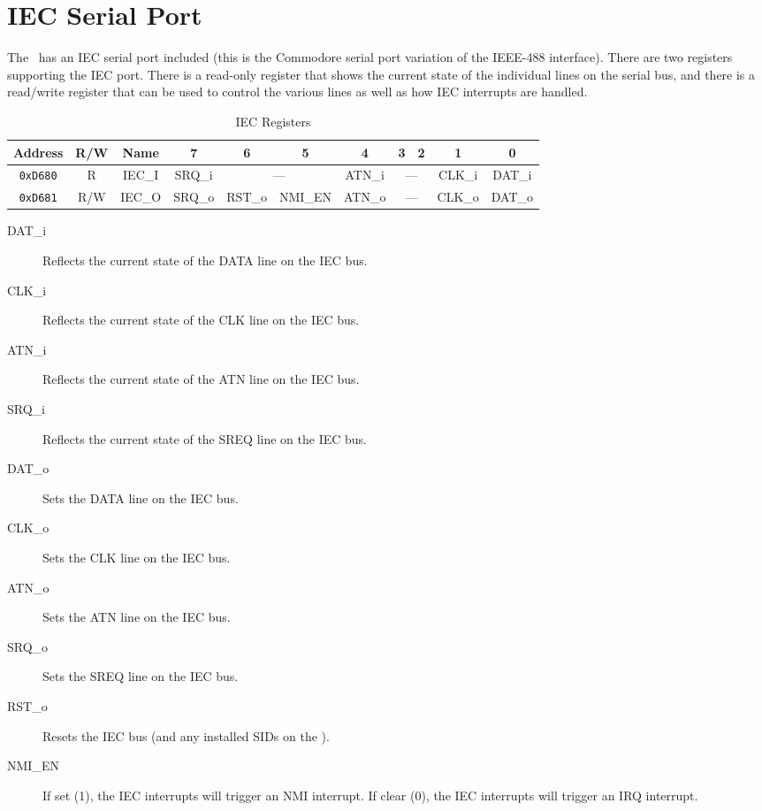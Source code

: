 \chapter{IEC Serial Port}

The \jr\ has an IEC serial port included (this is the Commodore serial port variation of the IEEE-488 interface). There are two registers supporting the IEC port. There is a read-only register that shows the current state of the individual lines on the serial bus, and there is a read/write register that can be used to control the various lines as well as how IEC interrupts are handled.

\begin{table}[h]
    \begin{center}
        \begin{tabular}{|c|c|c|c|c|c|c|c|c|c|c|} \hline
            Address & R/W & Name & 7 & 6 & 5 & 4 & 3 & 2 & 1 & 0 \\\hline\hline
            \verb+0xD680+ & R & IEC\_I & SRQ\_i & \multicolumn{2}{|c|}{---} & ATN\_i & \multicolumn{2}{|c|}{---} & CLK\_i & DAT\_i \\ \hline
            \verb+0xD681+ & R/W & IEC\_O & SRQ\_o & RST\_o & NMI\_EN & ATN\_o & \multicolumn{2}{|c|}{---} & CLK\_o & DAT\_o \\ \hline
        \end{tabular}
    \end{center}
    \caption{IEC Registers}
    \label{tab:iec_reg}
\end{table}

\begin{description}
    \item[DAT\_i] Reflects the current state of the DATA line on the IEC bus. 
    \item[CLK\_i] Reflects the current state of the CLK line on the IEC bus.
    \item[ATN\_i] Reflects the current state of the ATN line on the IEC bus.
    \item[SRQ\_i] Reflects the current state of the SREQ line on the IEC bus.
    
    \item[DAT\_o] Sets the DATA line on the IEC bus. 
    \item[CLK\_o] Sets the CLK line on the IEC bus.
    \item[ATN\_o] Sets the ATN line on the IEC bus.
    \item[SRQ\_o] Sets the SREQ line on the IEC bus.
    \item[RST\_o] Resets the IEC bus (and any installed SIDs on the \fjr).
    \item[NMI\_EN] If set (1), the IEC interrupts will trigger an NMI interrupt. If clear (0), the IEC interrupts will trigger an IRQ interrupt.  
\end{description}
